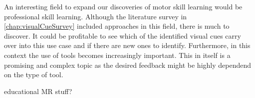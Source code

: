 An interesting field to expand our discoveries of motor skill learning would be professional skill learning.
Although the literature survey in \autoref{chap:visualCueSurvey} included approaches in this field, there is much to discover.
It could be profitable to see which of the identified visual cues carry over into this use case and if there are new ones to identify.
Furthermore, in this context the use of tools becomes increasingly important.
This in itself is a promising and complex topic as the desired feedback might be highly dependend on the type of tool.

educational MR stuff?

